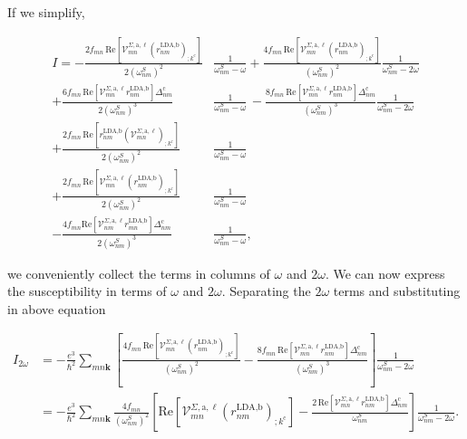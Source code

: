 If we simplify,

\begin{align}\label{simplified_i} 
I =
-\frac{2f_{mn}\,\mathrm{Re}\left[\mathcal{V}^{\Sigma,\text{a},\ell}_{mn}\left(r^{\text{LDA,b}}_{nm}\right)_{;k^{\text{c}}}\right]}{2(\omega^{S}_{nm})^{2}}&\frac{1}{\omega^{S}_{nm}-\omega}
+ \frac{4f_{mn}\,\mathrm{Re}\left[\mathcal{V}^{\Sigma,\text{a},\ell}_{mn}\left(r^{\text{LDA,b}}_{nm}\right)_{;k^{\text{c}}}\right]}{(\omega^{S}_{nm})^{2}}\frac{1}{\omega^{S}_{nm}-2\omega}\nonumber\\
+ \frac{6f_{mn}\,\mathrm{Re}\left[\mathcal{V}^{\Sigma,\text{a},\ell}_{mn}r^{\text{LDA,b}}_{nm}\right]\Delta^{\text{c}}_{nm}}{2(\omega^{S}_{nm})^{3}}&\frac{1}{\omega^{S}_{nm}-\omega} 
\,- \frac{8f_{mn}\,\mathrm{Re}\left[\mathcal{V}^{\Sigma,\text{a},\ell}_{mn}r^{\text{LDA,b}}_{nm}\right]\Delta^{\text{c}}_{nm}}{(\omega^{S}_{nm})^{3}}\frac{1}{\omega^{S}_{nm}-2\omega}\nonumber\\
+ \frac{2f_{mn}\,\mathrm{Re}\left[r^{\text{LDA,b}}_{nm}\left(\mathcal{V}^{\Sigma,\text{a},\ell}_{mn}\right)_{;k^{\text{c}}}\right]}{2(\omega^{S}_{nm})^{2}}&\frac{1}{\omega^{S}_{nm}-\omega}\nonumber\\
+ \frac{2f_{mn}\,\mathrm{Re}\left[\mathcal{V}^{\Sigma,\text{a},\ell}_{mn}\left(r^{\text{LDA,b}}_{nm}\right)_{;k^{\text{c}}}\right]}{2(\omega^{S}_{nm})^{2}}&\frac{1}{\omega^{S}_{nm}-\omega}\nonumber\\
- \frac{4f_{mn}\mathrm{Re}\left[\mathcal{V}^{\Sigma,\text{a},\ell}_{nm}r^{\text{LDA,b}}_{mn}\right]\Delta_{nm}^{\text{c}}}{2(\omega^{S}_{nm})^{3}}&\frac{1}{\omega^{S}_{nm}-\omega},
\end{align}

we conveniently collect the terms in columns of $\omega$ and $2\omega$. We can now express the susceptibility in terms of $\omega$ and $2\omega$. Separating the $2\omega$ terms and substituting in above equation

\begin{align}\label{2wchii}
I_{2\omega}
&= -\frac{e^{3}}{\hbar^2}\sum_{mn\mathbf{k}}\left[\frac{4f_{mn}\,\mathrm{Re}\left[\mathcal{V}^{\Sigma,\text{a},\ell}_{mn}\left(r^{\text{LDA,b}}_{nm}\right)_{;k^{\text{c}}}\right]}{(\omega^{S}_{nm})^{2}} - \frac{8f_{mn}\,\mathrm{Re}\left[\mathcal{V}^{\Sigma,\text{a},\ell}_{mn}r^{\text{LDA,b}}_{nm}\right]\Delta^{\text{c}}_{nm}}{(\omega^{S}_{nm})^{3}}\right]\frac{1}{\omega^{S}_{nm}-2\omega}\nonumber\\
&= -\frac{e^3}{\hbar^2}\sum_{mn\mathbf{k}}\frac{4f_{mn}}{(\omega^{S}_{nm})^{2}}\left[\mathrm{Re}\left[\mathcal{V}^{\Sigma,\text{a},\ell}_{mn}\left(r^{\text{LDA,b}}_{nm}\right)_{;k^{\text{c}}}\right] - \frac{2\,\mathrm{Re}\left[\mathcal{V}^{\Sigma,\text{a},\ell}_{mn}r^{\text{LDA,b}}_{nm}\right]\Delta^{\text{c}}_{nm}}{\omega^{S}_{nm}}\right]\frac{1}{\omega^{S}_{nm}-2\omega}.
\end{align}

